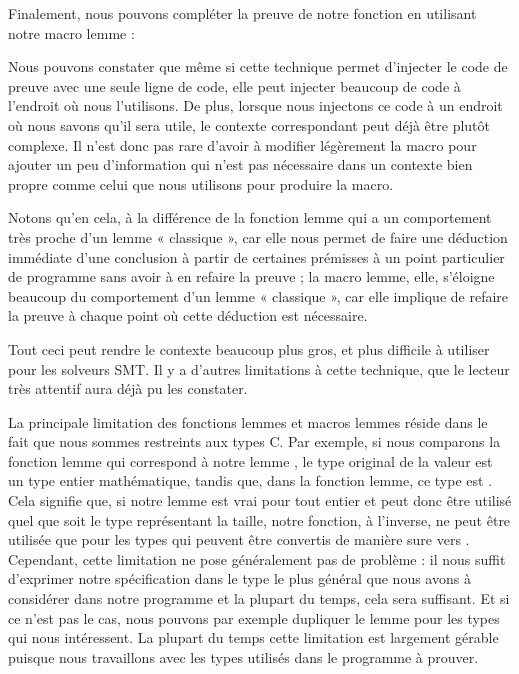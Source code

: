 Finalement, nous pouvons compléter la preuve de notre fonction 
en utilisant notre macro lemme :




Nous pouvons constater que même si cette technique permet d'injecter le code de
preuve avec une seule ligne de code, elle peut injecter beaucoup de code à
l'endroit où nous l'utilisons. De plus, lorsque nous injectons ce code à un endroit
où nous savons qu'il sera utile, le contexte correspondant peut déjà être plutôt
complexe. Il n'est donc pas rare d'avoir à modifier légèrement la macro pour
ajouter un peu d'information qui n'est pas nécessaire dans un contexte bien
propre comme celui que nous utilisons pour produire la macro.


Notons qu'en cela, à la différence de la fonction lemme qui a un comportement
très proche d'un lemme « classique », car elle nous permet de faire une
déduction immédiate d'une conclusion à partir de certaines prémisses à un point
particulier de programme sans avoir à en refaire la preuve ; la macro lemme,
elle, s'éloigne beaucoup du comportement d'un lemme « classique », car elle
implique de refaire la preuve à chaque point où cette déduction est nécessaire.


Tout ceci peut rendre le contexte beaucoup plus gros, et plus difficile à utiliser
pour les solveurs SMT. Il y a d'autres limitations à cette technique, que le lecteur
très attentif aura déjà pu les constater.




La principale limitation des fonctions lemmes et macros lemmes
réside dans le fait que nous sommes restreints aux types C. Par exemple, si nous
comparons la fonction lemme qui correspond à notre lemme
, le type original de la valeur
 est un type entier mathématique, tandis que, dans la
fonction lemme, ce type est . Cela signifie que, si
notre lemme est vrai pour tout entier et peut donc être utilisé quel que soit
le type représentant la taille, notre fonction, à l'inverse, ne peut être
utilisée que pour les types qui peuvent être
convertis de manière sure vers . Cependant, cette limitation
ne pose généralement pas de problème : il nous suffit d'exprimer notre
spécification dans le type le plus général que nous avons à considérer dans notre
programme et la plupart du temps, cela sera suffisant. Et si ce n'est pas le cas,
nous pouvons par exemple dupliquer le lemme pour les types qui nous intéressent.
La plupart du temps cette limitation est largement gérable puisque nous
travaillons avec les types utilisés dans le programme à prouver.


